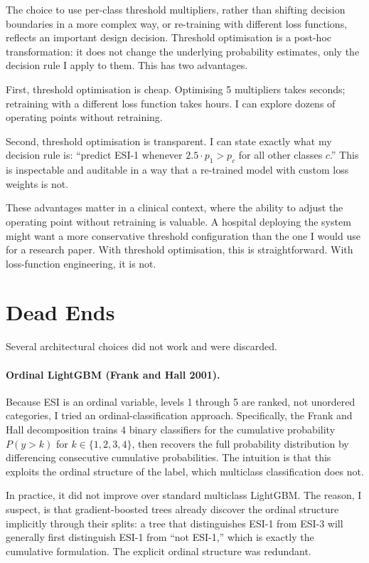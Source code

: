 The choice to use per-class threshold multipliers, rather than shifting decision boundaries in a more complex way, or re-training with different loss functions, reflects an important design decision. Threshold optimisation is a post-hoc transformation: it does not change the underlying probability estimates, only the decision rule I apply to them. This has two advantages.

First, threshold optimisation is cheap. Optimising 5 multipliers takes seconds; retraining with a different loss function takes hours. I can explore dozens of operating points without retraining.

Second, threshold optimisation is transparent. I can state exactly what my decision rule is: ``predict ESI-1 whenever $2.5 \cdot p_1 > p_c$ for all other classes $c$.'' This is inspectable and auditable in a way that a re-trained model with custom loss weights is not.

These advantages matter in a clinical context, where the ability to adjust the operating point without retraining is valuable. A hospital deploying the system might want a more conservative threshold configuration than the one I would use for a research paper. With threshold optimisation, this is straightforward. With loss-function engineering, it is not.

\section{Dead Ends}

Several architectural choices did not work and were discarded.

\paragraph{Ordinal LightGBM (Frank and Hall 2001).} Because ESI is an ordinal variable, levels 1 through 5 are ranked, not unordered categories, I tried an ordinal-classification approach. Specifically, the Frank and Hall decomposition \citep{frank2001ordinal} trains 4 binary classifiers for the cumulative probability $P(y > k)$ for $k \in \{1, 2, 3, 4\}$, then recovers the full probability distribution by differencing consecutive cumulative probabilities. The intuition is that this exploits the ordinal structure of the label, which multiclass classification does not.

In practice, it did not improve over standard multiclass LightGBM. The reason, I suspect, is that gradient-boosted trees already discover the ordinal structure implicitly through their splits: a tree that distinguishes ESI-1 from ESI-3 will generally first distinguish ESI-1 from ``not ESI-1,'' which is exactly the cumulative formulation. The explicit ordinal structure was redundant.

